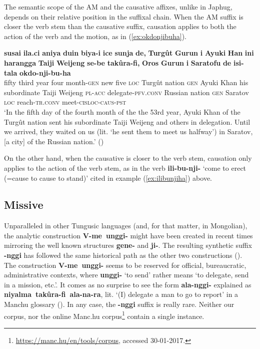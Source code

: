 \documentclass{article}
\newcommand{\ipa}[1]{\textbf{{\phon\mbox{#1}}}} %
\begin{document}
The semantic scope of the AM and the causative affixes, unlike in Japhug, depends on their relative position in the suffixal chain. When the AM suffix is closer the verb stem than the causative suffix, causation applies to both the action of the verb and the motion, as in (\ref{ex:okdonjibuha}).

\begin{exe}
\ex \label{ex:okdonjibuha}
\gll 
\ipa{susai}	\ipa{ila.ci}	\ipa{aniya}	\ipa{duin}	\ipa{biya-i}	\ipa{ice}	\ipa{sunja}	\ipa{de,}	\ipa{Turgût}	\ipa{Gurun}	\ipa{i}	\ipa{Ayuki}	\ipa{Han}	\ipa{ini}	\ipa{harangga}	\ipa{Taiji}	\ipa{Weijeng}	\ipa{se-be}	\ipa{takûra-fi,}	\ipa{Oros}	\ipa{Gurun}	\ipa{i}	\ipa{Saratofu}	\ipa{de}	\ipa{isi-tala}	\ipa{okdo-nji-bu-ha} \\
fifty third year four month-\textsc{gen} new five \textsc{loc} Turgût nation \textsc{gen} Ayuki Khan his subordinate Taiji Weijeng \textsc{pl-acc} delegate-\textsc{pfv.conv} Russian nation \textsc{gen} Saratov \textsc{loc} reach-\textsc{tr.conv} meet-\textsc{cisloc-caus-pst} \\
\glt ‘In the fifth day of the fourth month of the the 53rd year, Ayuki Khan of the Turgût nation sent his subordinate Taiji Weijeng and others in delegation. Until we arrived,
they waited on us (lit. `he sent them to meet us halfway’) in Saratov, [a city] of the Russian nation.’ (\citealt[175;88b-89a]{shunjuu64tulishen})
\end{exe}

On the other hand, when the causative is closer to the verb stem, causation only applies to the action of the verb stem, as in the verb \ipa{ili-bu-nji-} `come to erect (=cause to cause to stand)' cited in example (\ref{ex:ilibunjiha}) above.

\subsection{Missive} \label{sec:nggi}
Unparalleled in other Tungusic languages (and, for that matter, in Mongolian), the analytic construction \ipa{V-me unggi-} might have been  created in recent times mirroring the well known structures \ipa{gene-} and \ipa{ji-}. The resulting synthetic suffix \ipa{-nggi} has followed the same historical path as the other two constructions (\citealt[163]{zaxarov10manchu}). The construction  \ipa{V-me unggi-} seems to be reserved for official, bureaucratic, administrative contexts, where  \ipa{unggi-} ‘to send’ rather means ‘to delegate, send in a mission, etc.’. It comes as no surprise to see the form  \ipa{ala-nggi-} explained as  \ipa{niyalma takûra-fi ala-na-ra}, lit. ‘(I) delegate a man to go to report’ in a Manchu glossary (\citealt[157]{enxbat16leksika}).  In any case, the \ipa{-nggi} suffix is really rare. Neither our corpus, nor the online Manc.hu corpus\footnote{ \url{https://manc.hu/en/tools/corpus}, accessed 30-01-2017.} contain a single instance.
\end{document}
